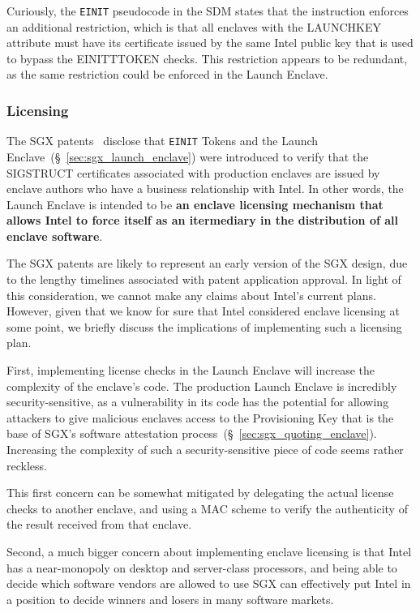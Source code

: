 Curiously, the \texttt{EINIT} pseudocode in the SDM states that the instruction
enforces an additional restriction, which is that all enclaves with the
LAUNCHKEY attribute must have its certificate issued by the same Intel public
key that is used to bypass the EINITTTOKEN checks. This restriction appears to
be redundant, as the same restriction could be enforced in the Launch Enclave.


\subsubsection{Licensing}
\label{sec:sgx_licensing}

The SGX patents~\cite{intel2013patent1, intel2013patent2} disclose that
\texttt{EINIT} Tokens and the Launch Enclave~(\S~\ref{sec:sgx_launch_enclave})
were introduced to verify that the SIGSTRUCT certificates associated with
production enclaves are issued by enclave authors who have a business
relationship with Intel. In other words, the Launch Enclave is intended to be
\textbf{an enclave licensing mechanism that allows Intel to force itself as an
itermediary in the distribution of all enclave software}.

The SGX patents are likely to represent an early version of the SGX design, due
to the lengthy timelines associated with patent application approval.
In light of this consideration, we cannot make any claims about Intel's current
plans. However, given that we know for sure that Intel considered enclave
licensing at some point, we briefly discuss the implications of implementing
such a licensing plan.

First, implementing license checks in the Launch Enclave will increase the
complexity of the enclave's code. The production Launch Enclave is incredibly
security-sensitive, as a vulnerability in its code has the potential for
allowing attackers to give malicious enclaves access to the Provisioning Key
that is the base of SGX's software attestation
process~(\S~\ref{sec:sgx_quoting_enclave}). Increasing the complexity of such a
security-sensitive piece of code seems rather reckless.

This first concern can be somewhat mitigated by delegating the actual license
checks to another enclave, and using a MAC scheme to verify the authenticity of
the result received from that enclave.

Second, a much bigger concern about implementing enclave licensing is that
Intel has a near-monopoly on desktop and server-class processors, and being
able to decide which software vendors are allowed to use SGX can effectively
put Intel in a position to decide winners and losers in many software markets.


